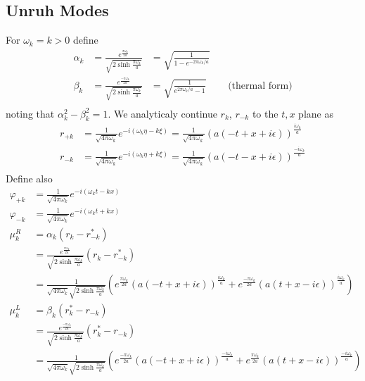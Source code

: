\documentclass[12pt,a4paper]{article}
\begin{document}
\subsection{Unruh Modes}
For $\omega_k = k > 0$ define
\begin{equation}
  \begin{array}{llll}
    \alpha_k &= \frac{e^{\frac{\pi\omega_k}{2a}}}{\sqrt{2 \sinh \frac{\pi \omega_k}{a}}} &= \sqrt{\frac{1}{1 - e^{-2\pi\omega_k / a}}} &  \\
    \beta_k &= \frac{e^{\frac{-\pi\omega_k}{2a}}}{\sqrt{2 \sinh \frac{\pi \omega_k}{a}}} &= \sqrt{\frac{1}{e^{2\pi\omega_k / a} - 1}} & \quad \text{(thermal form)} \\
  \end{array}
  \label{alpha_beta}
\end{equation}
noting that $\alpha_k^2 - \beta_k^2 = 1$. We analyticaly continue $r_k$, $r_{-k}$ to the $t,x$ plane as
\begin{equation}
  \begin{array}{ll}
    r_{+k} &= \frac{1}{\sqrt{4 \pi \omega_k}} e^{-i(\omega_k \eta - k \xi)} = \frac{1}{\sqrt{4 \pi \omega_k}} (a(-t + x + i \epsilon))^{\frac{i \omega_k}{a}} \\
    r_{-k} &= \frac{1}{\sqrt{4 \pi \omega_k}} e^{-i(\omega_k \eta + k \xi)} = \frac{1}{\sqrt{4 \pi \omega_k}} (a(-t - x + i \epsilon))^{\frac{-i \omega_k}{a}} \\
  \end{array}
\end{equation}
Define also
\begin{equation}
  \begin{array}{ll}
    \varphi_{+k} &= \frac{1}{\sqrt{4 \pi \omega_k}} e^{-i(\omega_k t - k x)}\\
    \varphi_{-k} &= \frac{1}{\sqrt{4 \pi \omega_k}} e^{-i(\omega_k t + k x)}\\
    \mu^R_k &= \alpha_k (r_k - r_{-k}^*) \\
    &= \frac{e^{\frac{\pi \omega_k}{2a}}}{\sqrt{2 \sinh \frac{\pi \omega_k}{a}}} \left(r_k - r_{-k}^* \right) \\
    &= \frac{1}{\sqrt{4 \pi \omega_k}\sqrt{2 \sinh \frac{\pi \omega_k}{a}}} \left( e^{\frac{\pi \omega_k}{2a}} \left(a(-t+x+i\epsilon)\right)^{\frac{i\omega_k}{a}} + e^{\frac{-\pi \omega_k}{2a}} \left(a(t+x-i\epsilon)\right)^{\frac{i\omega_k}{a}} \right) \\
    \mu^L_k &= \beta_k (r_k^* - r_{-k} )\\
    &=\frac{e^{\frac{-\pi \omega_k}{2a}}}{\sqrt{2 \sinh \frac{\pi \omega_k}{a}}} \left(r_k^* - r_{-k} \right) \\
    &=\frac{1}{\sqrt{4 \pi \omega_k}\sqrt{2 \sinh \frac{\pi \omega_k}{a}}} \left( e^{\frac{-\pi \omega_k}{2a}} \left(a(-t+x+i\epsilon)\right)^{\frac{-i\omega_k}{a}} + e^{\frac{\pi \omega_k}{2a}} \left(a(t+x-i\epsilon)\right)^{\frac{-i\omega_k}{a}} \right) \\
  \end{array}
\end{equation}
\end{document}

